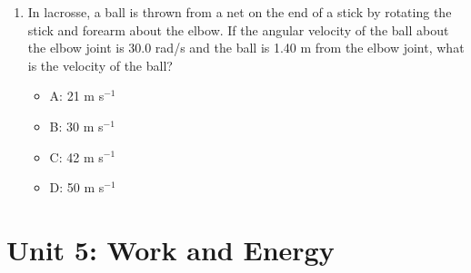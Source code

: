 \documentclass[10pt]{article}
\begin{document}
\begin{enumerate}
\begin{itemize}
\item A: 0.13 N
\item B: 0.53 N
\item C: 0.83 N
\item D: 1.23 N
\end{itemize}
\item In lacrosse, a ball is thrown from a net on the end of a stick by rotating the stick and forearm about the elbow. If the angular velocity of the ball about the elbow joint is 30.0 rad/s and the ball is 1.40 m from the elbow joint, what is the velocity of the ball?
\begin{itemize}
\item A: 21 m s$^{-1}$
\item B: 30 m s$^{-1}$
\item C: 42 m s$^{-1}$
\item D: 50 m s$^{-1}$
\end{itemize}
\end{enumerate}

\section{Unit 5: Work and Energy}
\end{document}
